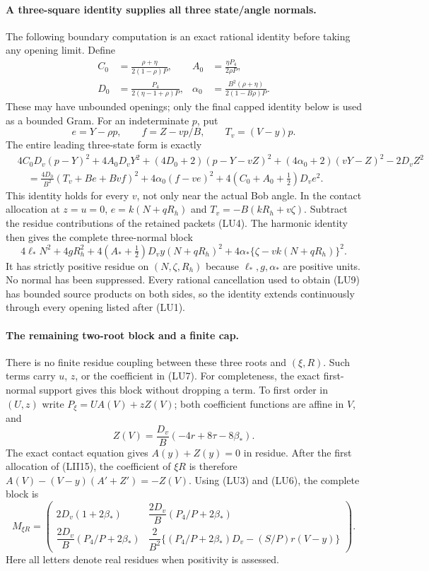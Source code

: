 \paragraph{A three-square identity supplies all three state/angle normals.}
The following boundary computation is an exact rational identity
before taking any opening limit.  Define
\[
\begin{aligned}
 C_0&=\frac{\rho+\eta}{2(1-\rho)P},&
 A_0&=\frac{\eta P_4}{2\rho P},\\
 D_0&=\frac{P_4}{2(\eta-1+\rho)P},&
 \alpha_0&=\frac{B^2(\rho+\eta)}{2(1-B\rho)P}.
\end{aligned}
\]
These may have unbounded openings; only the final capped identity
below is used as a bounded Gram.  For an indeterminate $p$, put
\[
 e=Y-\rho p,\qquad f=Z-vp/B,\qquad T_v=(V-y)p.
\]
The entire leading three-state form is exactly
\[
\begin{split}
 &4C_0D_v(p-Y)^2+4A_0D_vY^2
 +(4D_0+2)(p-Y-vZ)^2+(4\alpha_0+2)(vY-Z)^2-2D_vZ^2\\
 &\quad=\frac{4D_0}{B^2}(T_v+Be+Bvf)^2
       +4\alpha_0(f-ve)^2+4(C_0+A_0+\tfrac12)D_ve^2.
\end{split}                                                    \tag{LU8}
\]
This identity holds for every $v$, not only near the actual Bob
angle.  In the contact allocation at $z=u=0$,
$e=k(N+qR_h)$ and $T_v=-B(kR_h+v\zeta)$.
Subtract the residue contributions of the retained packets (LU4).
The harmonic identity then gives the complete three-normal block
\[
 \boxed{4\ell_*N^2+4gR_h^2
 +4(A_*+\tfrac12)D_vy(N+qR_h)^2
 +4\alpha_*\{\zeta-vk(N+qR_h)\}^2.}                     \tag{LU9}
\]
It has strictly positive residue on $(N,\zeta,R_h)$ because
$\ell_*,g,\alpha_*$ are positive units.  No normal has been
suppressed.  Every rational cancellation used to obtain (LU9)
has bounded source products on both sides, so the identity extends
continuously through every opening listed after (LU1).

\paragraph{The remaining two-root block and a finite cap.}
There is no finite residue coupling between these three roots and
$(\xi,R)$.  Such terms carry $u$, $z$, or the coefficient in (LU7).
For completeness, the exact first-normal support gives this block
without dropping a term.  To first order in $(U,z)$ write
$P_\xi=UA(V)+zZ(V)$; both coefficient functions are affine in $V$,
and
\[
 Z(V)=\frac{D_v}{B}(-4r+8\tau-8\beta_*).
\]
The exact contact equation gives $A(y)+Z(y)=0$ in residue.
After the first allocation of (LII15), the coefficient of $\xi R$
is therefore $A(V)-(V-y)(A'+Z')=-Z(V)$.
Using (LU3) and (LU6), the complete block is
\[
 M_{\xi R}=
 \begin{pmatrix}
 2D_v(1+2\beta_*)&\dfrac{2D_v}{B}(P_4/P+2\beta_*)\\[1mm]
 \dfrac{2D_v}{B}(P_4/P+2\beta_*)&
 \dfrac2{B^2}\{(P_4/P+2\beta_*)D_v-(S/P)r(V-y)\}
 \end{pmatrix}.                                           \tag{LU10}
\]
Here all letters denote real residues when positivity is assessed.

